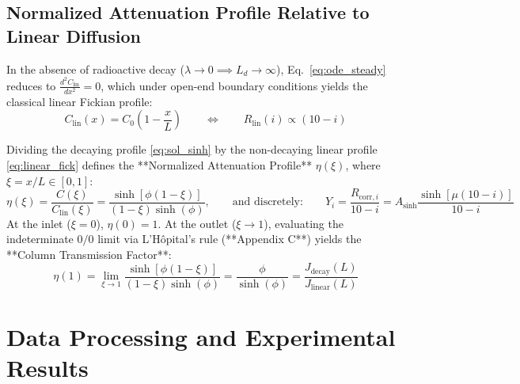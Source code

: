 \documentclass[11pt,a4paper]{article}
\begin{document}
\subsection{Normalized Attenuation Profile Relative to Linear Diffusion}
In the absence of radioactive decay ($\lambda \to 0 \implies L_d \to \infty$), Eq.~\eqref{eq:ode_steady} reduces to $\frac{d^2 C_{\text{lin}}}{dx^2} = 0$, which under open-end boundary conditions yields the classical linear Fickian profile:
\begin{equation}
    C_{\text{lin}}(x) = C_0 \left(1 - \frac{x}{L}\right) \qquad \Longleftrightarrow \qquad R_{\text{lin}}(i) \propto (10 - i)
    \label{eq:linear_fick}
\end{equation}

Dividing the decaying profile \eqref{eq:sol_sinh} by the non-decaying linear profile \eqref{eq:linear_fick} defines the **Normalized Attenuation Profile** $\eta(\xi)$, where $\xi = x/L \in [0, 1]$:
\begin{equation}
    \eta(\xi) = \frac{C(\xi)}{C_{\text{lin}}(\xi)} = \frac{\sinh\left[\phi(1 - \xi)\right]}{(1 - \xi)\sinh(\phi)}, \qquad \text{and discretely:} \qquad Y_i = \frac{R_{\text{corr}, i}}{10 - i} = A_{\text{sinh}} \frac{\sinh\left[\mu(10 - i)\right]}{10 - i}
    \label{eq:normalized_profile}
\end{equation}
At the inlet ($\xi = 0$), $\eta(0) = 1$. At the outlet ($\xi \to 1$), evaluating the indeterminate $0/0$ limit via L'Hôpital's rule (**Appendix C**) yields the **Column Transmission Factor**:
\begin{equation}
    \eta(1) = \lim_{\xi \to 1} \frac{\sinh\left[\phi(1 - \xi)\right]}{(1 - \xi)\sinh(\phi)} = \frac{\phi}{\sinh(\phi)} = \frac{J_{\text{decay}}(L)}{J_{\text{linear}}(L)}
    \label{eq:transmission_factor}
\end{equation}

\section{Data Processing and Experimental Results}
\end{document}
